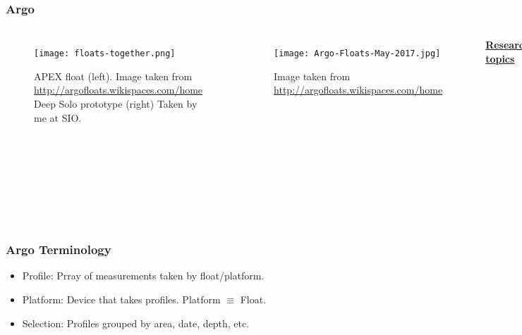 \begin{frame}
\frametitle{Argo}
\begin{columns}
\begin{figure}
    \centering
    \begin{minipage}{.9\columnwidth}
    \texttt{[image: floats-together.png]}
    \caption{\tiny{APEX float (left). Image taken from \url{http://argofloats.wikispaces.com/home} Deep Solo prototype (right) Taken by me at SIO.}}
    \end{minipage}
\end{figure}
\begin{figure}
    \vspace*{-.73cm}
    \centering
    \begin{minipage}{.9\columnwidth}
    \texttt{[image: Argo-Floats-May-2017.jpg]}
    \caption{\tiny{Image taken from \url{http://argofloats.wikispaces.com/home}}}
    \end{minipage}
\end{figure}
\vspace*{-.4cm}
\underline{\textbf{Research topics}}
\begin{itemize}
    \item How to access data?
    \item How to visualize data set?
    \item How to handle errors?
\end{itemize}
\end{columns}
\end{frame}

\begin{frame}
\frametitle{Argo Terminology}
\begin{itemize}
    \item Profile: Prray of measurements taken by float/platform.
    \item Platform: Device that takes profiles. Platform $\equiv$ Float.
    \item Selection: Profiles grouped by area, date, depth, etc.
\end{itemize}
\end{frame}

